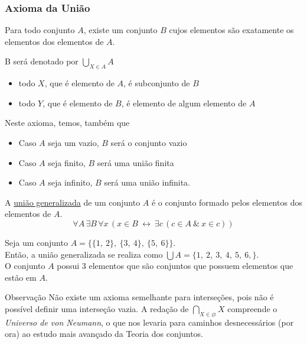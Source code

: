 \subsubsection{Axioma da União}
\begin{stat}
    Para todo conjunto $A$, existe um conjunto $B$ cujos elementos são exatamente os elementos dos elementos de $A$.
\end{stat}
    B será denotado por $\bigcup\limits_{X \in A}^{} A$
\begin{itemize}
  \item todo $X$, que é elemento de $A$, é subconjunto de $B$
  \item todo $Y$, que é elemento de $B$, é elemento de algum elemento de $A$
\end{itemize}
Neste axioma, temos, também que
\begin{itemize}
  \item Caso $A$ seja um vazio, $B$ será o conjunto vazio
  \item Caso $A$ seja finito, $B$ será uma união finita
  \item Caso $A$ seja infinito, $B$ será uma união infinita.
\end{itemize}

\begin{definition}
    A \underline{união generalizada} de um conjunto $A$ é o conjunto formado pelos elementos dos elementos de $A$.
$$\forall A\,\exists B\,\forall x\,(x\in B\ \leftrightarrow\ \exists c\,(c\in A\ \&\ x\in c))$$
\end{definition}
\begin{exmp}
    Seja um conjunto $A = \{\{1,\ 2\},\ \{3,\ 4\},\ \{5,\ 6\}\}$.\\
    Então, a união generalizada se realiza como $\bigcup A = \{1,\ 2,\ 3,\ 4,\ 5,\ 6,\}$.\\
    O conjunto $A$ possui 3 elementos que são conjuntos que possuem elementos que estão em $A$.
\end{exmp}

\begin{mymdframed}{Observação}
Não existe um axioma semelhante para interseções, pois não é possível definir uma interseção vazia. A redação de $\bigcap\limits_{X \in \varnothing}^{} X$ compreende o \textit{Universo de von Neumann}, o que nos levaria para caminhos desnecessários (por ora) ao estudo mais avançado da Teoria dos conjuntos.
\end{mymdframed}

